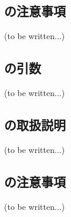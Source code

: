 \subsection{\DLone の注意事項\TBW}
(to be written...)



\clearpage


\subsection{\OwarmingupA の引数\TBW}
(to be written...)


\subsection{\OwarmingupA の取扱説明\TBW}
(to be written...)


\subsection{\OwarmingupA の注意事項\TBW}
(to be written...)



\clearpage


